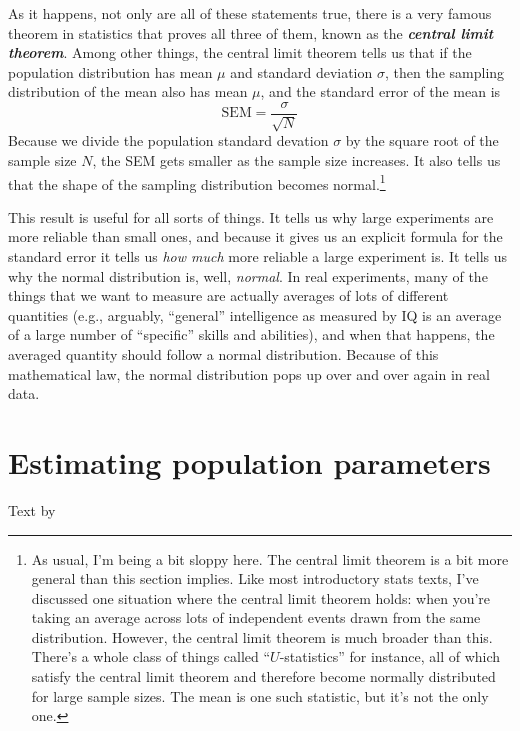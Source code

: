 \documentclass[
]{book}
\begin{document}
As it happens, not only are all of these statements true, there is a very famous theorem in statistics that proves all three of them, known as the \textbf{\emph{central limit theorem}}. Among other things, the central limit theorem tells us that if the population distribution has mean \(\mu\) and standard deviation \(\sigma\), then the sampling distribution of the mean also has mean \(\mu\), and the standard error of the mean is
\[
\mbox{SEM} = \frac{\sigma}{ \sqrt{N} }
\]
Because we divide the population standard devation \(\sigma\) by the square root of the sample size \(N\), the SEM gets smaller as the sample size increases. It also tells us that the shape of the sampling distribution becomes normal.\footnote{As usual, I'm being a bit sloppy here. The central limit theorem is a bit more general than this section implies. Like most introductory stats texts, I've discussed one situation where the central limit theorem holds: when you're taking an average across lots of independent events drawn from the same distribution. However, the central limit theorem is much broader than this. There's a whole class of things called ``\(U\)-statistics'' for instance, all of which satisfy the central limit theorem and therefore become normally distributed for large sample sizes. The mean is one such statistic, but it's not the only one.}

This result is useful for all sorts of things. It tells us why large experiments are more reliable than small ones, and because it gives us an explicit formula for the standard error it tells us \emph{how much} more reliable a large experiment is. It tells us why the normal distribution is, well, \emph{normal}. In real experiments, many of the things that we want to measure are actually averages of lots of different quantities (e.g., arguably, ``general'' intelligence as measured by IQ is an average of a large number of ``specific'' skills and abilities), and when that happens, the averaged quantity should follow a normal distribution. Because of this mathematical law, the normal distribution pops up over and over again in real data.

\hypertarget{pointestimates}{%
\section{Estimating population parameters}\label{pointestimates}}

Text by \citet{Navarro2018}
\end{document}
